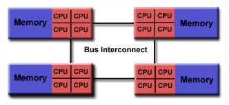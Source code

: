 \begin{description}
\begin{description}
\begin{itemize}
\begin{figure}
\begin{subfigure}[b]{0.5\textwidth}
				\caption[]{}%
			\end{subfigure}%
			\begin{subfigure}[b]{0.5\textwidth}
				\centering
				\includegraphics[width=0.92\textwidth]{./images/parallel_programming/numa}
				\caption[]{}%
			\end{subfigure}%
		\label{fig:UMA_NUMA}
		\end{figure}
		


\end{itemize}
\end{description}
\end{description}

